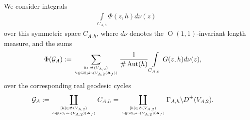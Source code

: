 \documentclass{amsart}
\theoremstyle{definition}
\begin{document}
We consider integrals 
\begin{align*} \int\limits_{C_{A,h}} \Phi(z, h) d \nu (z) \end{align*}
over this symmetric space $C_{A,h}$, where $d \nu$ denotes the $\operatorname{O}(1,1)$-invariant length measure, and the sums
\begin{align*} \Phi(\mathcal{G}_A) &:= \sum\limits_{ h \in \mathfrak{G}(V_{A,2}) \atop h \in \operatorname{GSpin}(V_{A,2}({\bf{A}}_f))} \frac{1}{\# \operatorname{Aut}(h)} 
\int\limits_{C_{A, h}} G(z, h) d \nu (z), \end{align*}
over the corresponding real geodesic cycles
\begin{align}\label{G_A} \mathcal{G}_A &:= \coprod_{[h] \in \mathfrak{G}(V_{A,2}) \atop h \in \operatorname{GSpin}(V_{A,2})({\bf{A}}_f)} C_{A,h}
= \coprod_{[h] \in \mathfrak{G}(V_{A,2}) \atop h \in \operatorname{GSpin}(V_{A,2})({\bf{A}}_f)} \Gamma_{A, h} \backslash D^{\pm}(V_{A,2}). \end{align}
\end{document}
